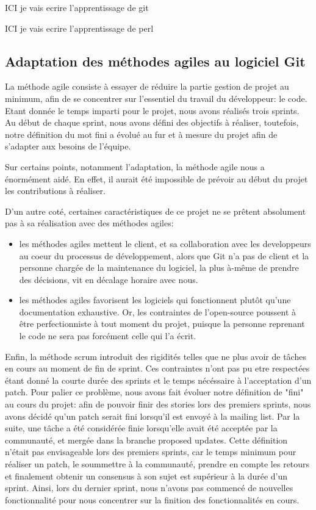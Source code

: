 \documentclass[a4paper, 12pt]{article}
\newenvironment{parremil}{%
  \color{red}
}{%
  \color{white}
}
\begin{document}
\begin{parremil}
ICI je vais ecrire l'apprentissage de git
\end{parremil}

\begin{parremil}
ICI je vais ecrire l'apprentissage de perl
\end{parremil}

\subsection{Adaptation des méthodes agiles au logiciel Git}

La méthode agile consiste à essayer de réduire la partie gestion de projet au minimum, afin de se concentrer sur l'essentiel du travail du développeur: le code.
Etant donnée le temps imparti pour le projet, nous avons réalisés trois sprints.
Au début de chaque sprint, nous avons défini des objectifs à réaliser, toutefois, notre définition du mot fini a évolué au fur et à mesure du projet afin de s'adapter aux besoins de l'équipe.

Sur certains points, notamment l'adaptation, la méthode agile nous a énormément aidé. En effet, il aurait été impossible de prévoir au début du projet les contributions à réaliser.

D'un autre coté, certaines caractéristiques de ce projet ne se prêtent absolument pas à sa réalisation avec des méthodes agiles:
\begin{itemize}
\item les méthodes agiles mettent le client, et sa collaboration avec les developpeurs au coeur du processus de développement, alors que Git n'a pas de client et la personne chargée de la maintenance du logiciel, la plus à-même de prendre des décisions, vit en décalage horaire avec nous.
\item les méthodes agiles favorisent les logiciels qui fonctionnent plutôt qu'une documentation exhaustive.
Or, les contraintes de l'open-source poussent à être perfectionniste à tout moment du projet, puisque la personne reprenant le code ne sera pas forcément celle qui l'a écrit.
\end{itemize}

Enfin, la méthode scrum introduit des rigidités telles que ne plus avoir de tâches en cours au moment de fin de sprint.
Ces contraintes n'ont pas pu etre respectées étant donné la courte durée des sprints et le temps nécéssaire à l'acceptation d'un patch.
Pour palier ce problème, nous avons fait évoluer notre définition de "fini" au cours du projet: afin de pouvoir finir des stories lors des premiers sprints, nous avons décidé qu'un patch serait fini lorsqu'il est envoyé à la mailing list.
Par la suite, une tâche a été considérée finie lorsqu'elle avait été acceptée par la communauté, et mergée dans la branche proposed updates.
Cette définition n'était pas envisageable lors des premiers sprints, car le temps minimum pour réaliser un patch, le soummettre à la communauté, prendre en compte les retours et finalement obtenir un consensus à son sujet est supérieur à la durée d'un sprint.
Ainsi, lors du dernier sprint, nous n'avons pas commencé de nouvelles fonctionnalité pour nous concentrer sur la finition des fonctionnalités en cours.
\end{document}
